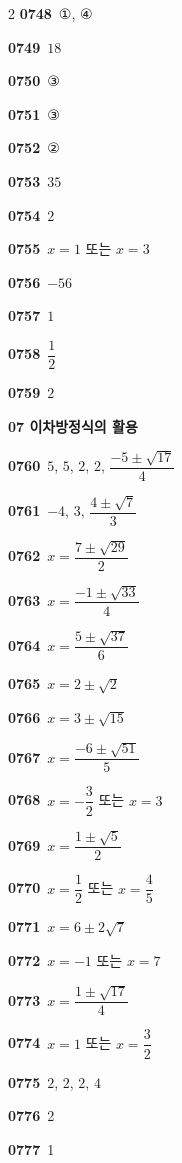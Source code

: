 \documentclass[10pt,a4paper]{article}
\begin{document}
\begin{multicols}{2}
\noindent\textbf{0748}\ ①, ④\par
\noindent\textbf{0749}\ $18$\par
\noindent\textbf{0750}\ ③\par
\noindent\textbf{0751}\ ③\par
\noindent\textbf{0752}\ ②\par
\noindent\textbf{0753}\ $35$\par
\noindent\textbf{0754}\ $2$\par
\noindent\textbf{0755}\ $x=1$ 또는 $x=3$\par
\noindent\textbf{0756}\ $-56$\par
\noindent\textbf{0757}\ $1$\par
\noindent\textbf{0758}\ $\dfrac{1}{2}$\par
\noindent\textbf{0759}\ $2$\par
\noindent\textbf{07 이차방정식의 활용}\par\smallskip
\noindent\textbf{0760}\ $5$, $5$, $2$, $2$, $\dfrac{-5\pm\sqrt{17}}{4}$\par
\noindent\textbf{0761}\ $-4$, $3$, $\dfrac{4\pm\sqrt{7}}{3}$\par
\noindent\textbf{0762}\ $x=\dfrac{7\pm\sqrt{29}}{2}$\par
\noindent\textbf{0763}\ $x=\dfrac{-1\pm\sqrt{33}}{4}$\par
\noindent\textbf{0764}\ $x=\dfrac{5\pm\sqrt{37}}{6}$\par
\noindent\textbf{0765}\ $x=2\pm\sqrt{2}$\par
\noindent\textbf{0766}\ $x=3\pm\sqrt{15}$\par
\noindent\textbf{0767}\ $x=\dfrac{-6\pm\sqrt{51}}{5}$\par
\noindent\textbf{0768}\ $x=-\dfrac{3}{2}$ 또는 $x=3$\par
\noindent\textbf{0769}\ $x=\dfrac{1\pm\sqrt{5}}{2}$\par
\noindent\textbf{0770}\ $x=\dfrac{1}{2}$ 또는 $x=\dfrac{4}{5}$\par
\noindent\textbf{0771}\ $x=6\pm2\sqrt{7}$\par
\noindent\textbf{0772}\ $x=-1$ 또는 $x=7$\par
\noindent\textbf{0773}\ $x=\dfrac{1\pm\sqrt{17}}{4}$\par
\noindent\textbf{0774}\ $x=1$ 또는 $x=\dfrac{3}{2}$\par
\noindent\textbf{0775}\ $2$, $2$, $2$, $4$\par
\noindent\textbf{0776}\ 2\par
\noindent\textbf{0777}\ 1\par

\end{multicols}
\end{document}

